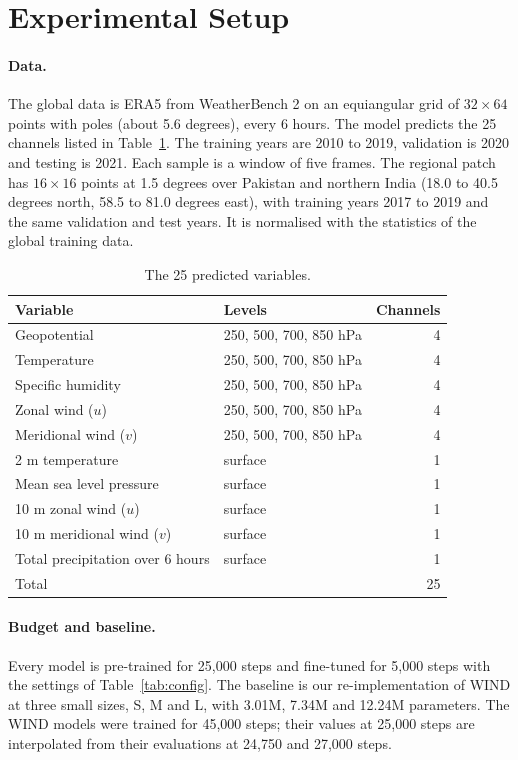 \documentclass{article}
\begin{document}
\section{Experimental Setup}
\label{sec:setup}

\paragraph{Data.}
The global data is ERA5 from WeatherBench 2 on an equiangular grid of $32\times64$ points with poles (about 5.6 degrees), every 6 hours. The model predicts the 25 channels listed in Table~\ref{tab:variables}. The training years are 2010 to 2019, validation is 2020 and testing is 2021. Each sample is a window of five frames. The regional patch has $16\times16$ points at 1.5 degrees over Pakistan and northern India (18.0 to 40.5 degrees north, 58.5 to 81.0 degrees east), with training years 2017 to 2019 and the same validation and test years. It is normalised with the statistics of the global training data.

\begin{table}[htbp]
\centering
\caption{The 25 predicted variables.}
\label{tab:variables}
\footnotesize
\begin{tabular}{llr}
\toprule
Variable & Levels & Channels \\
\midrule
Geopotential & 250, 500, 700, 850 hPa & 4 \\
Temperature & 250, 500, 700, 850 hPa & 4 \\
Specific humidity & 250, 500, 700, 850 hPa & 4 \\
Zonal wind ($u$) & 250, 500, 700, 850 hPa & 4 \\
Meridional wind ($v$) & 250, 500, 700, 850 hPa & 4 \\
2 m temperature & surface & 1 \\
Mean sea level pressure & surface & 1 \\
10 m zonal wind ($u$) & surface & 1 \\
10 m meridional wind ($v$) & surface & 1 \\
Total precipitation over 6 hours & surface & 1 \\
\midrule
Total & & 25 \\
\bottomrule
\end{tabular}
\end{table}

\paragraph{Budget and baseline.}
Every model is pre-trained for 25,000 steps and fine-tuned for 5,000 steps with the settings of Table~\ref{tab:config}. The baseline is our re-implementation of WIND at three small sizes, S, M and L, with 3.01M, 7.34M and 12.24M parameters. The WIND models were trained for 45,000 steps; their values at 25,000 steps are interpolated from their evaluations at 24,750 and 27,000 steps.
\end{document}
